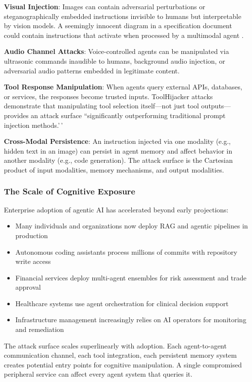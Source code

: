 \documentclass[
]{article}
\begin{document}
\textbf{Visual Injection}: Images can contain adversarial perturbations
or steganographically embedded instructions invisible to humans but
interpretable by vision models. A seemingly innocent diagram in a
specification document could contain instructions that activate when
processed by a multimodal agent \cite{qi2024visual}.

\textbf{Audio Channel Attacks}: Voice-controlled agents can be
manipulated via ultrasonic commands inaudible to humans, background
audio injection, or adversarial audio patterns embedded in legitimate
content.

\textbf{Tool Response Manipulation}: When agents query external APIs,
databases, or services, the responses become trusted inputs.
ToolHijacker attacks \cite{toolhijacker2025} demonstrate that
manipulating tool selection itself---not just tool outputs---provides an
attack surface ``significantly outperforming traditional prompt
injection methods.'\,'

\textbf{Cross-Modal Persistence}: An instruction injected via one
modality (e.g., hidden text in an image) can persist in agent memory and
affect behavior in another modality (e.g., code generation). The attack
surface is the Cartesian product of input modalities, memory mechanisms,
and output modalities.

\subsubsection{The Scale of Cognitive
Exposure}\label{the-scale-of-cognitive-exposure}

Enterprise adoption of agentic AI has accelerated beyond early
projections:

\begin{itemize}
\item Many individuals and organizations now deploy RAG and agentic pipelines in production
\item Autonomous coding assistants process millions of commits with repository write access
\item Financial services deploy multi-agent ensembles for risk assessment and trade approval
\item Healthcare systems use agent orchestration for clinical decision support
\item Infrastructure management increasingly relies on AI operators for monitoring and remediation
\end{itemize}

The attack surface scales superlinearly with adoption. Each
agent-to-agent communication channel, each tool integration, each
persistent memory system creates potential entry points for cognitive
manipulation. A single compromised peripheral service can affect every
agent system that queries it.
\end{document}
